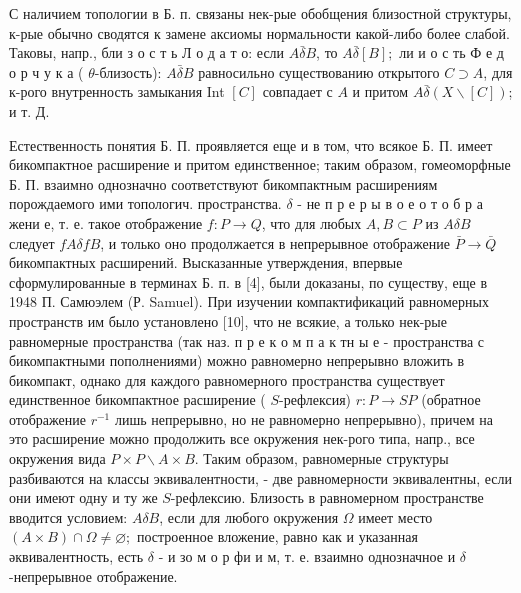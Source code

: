 \documentclass[10pt]{article}
\begin{document}
С наличием топологии в Б. п. связаны нек-рые обобщения близостной структуры, к-рые обычно сводятся к замене аксиомы нормальности какой-либо более слабой. Таковы, напр., бли з о с т ь Л о д а т о: если $A \bar{\delta} B$, то $A \bar{\delta}[B] ;$ ли и о с ть Ф е д о р ч у к а ( $\theta$-близость): $A \bar{\delta} B$ равносильно существованию открытого $C \supset A$, для к-рого внутренность замыкания Int $[C]$ совпадает с $A$ и притом $A \bar{\delta}(X \backslash[C])$; и т. Д.



Естественность понятия Б. П. проявляется еще и в том, что всякое Б. П. имеет бикомпактное расширение и притом единственное; таким образом, гомеоморфные Б. П. взаимно однозначно соответствуют бикомпактным расширениям порождаемого ими топологич. пространства. $\delta$ - не п р е р ы в о е о т о б р а жени е, т. е. такое отображение $f: P \rightarrow Q$, что для любых $A, B \subset P$ из $A \delta B$ следует $f A \delta f B$, и только оно продолжается в непрерывное отображение $\bar{P} \rightarrow \bar{Q}$ бикомпактных расширений. Высказанные утверждения, впервые сформулированные в терминах Б. п. в [4], были доказаны, по существу, еще в 1948 П. Самюэлем (Р. Samuel). При изучении компактификаций равномерных пространств им было установлено [10], что не всякие, а только нек-рые равномерные пространства (так наз. п р е к о м п а к тн ы е - пространства с бикомпактными пополнениями) можно равномерно непрерывно вложить в бикомпакт, однако для каждого равномерного пространства существует единственное бикомпактное расширение ( $S$-рефлексия) $r: P \rightarrow S P$ (обратное отображение $r^{-1}$ лишь непрерывно, но не равномерно непрерывно), причем на это расширение можно продолжить все окружения нек-рого типа, напр., все окружения вида $P \times P \backslash A \times B$. Таким образом, равномерные структуры разбиваются на классы эквивалентности, - две равномерности эквивалентны, если они имеют одну и ту же $S$-рефлексию. Близость в равномерном пространстве вводится условием: $A \delta B$, если для любого окружения $\Omega$ имеет место $(A \times B) \cap \Omega \neq \varnothing ;$ построенное вложение, равно как и указанная әквивалентность, есть $\delta$ - и зо м о р фи и м, т. е. взаимно однозначное и $\delta$-непрерывное отображение.
\end{document}

